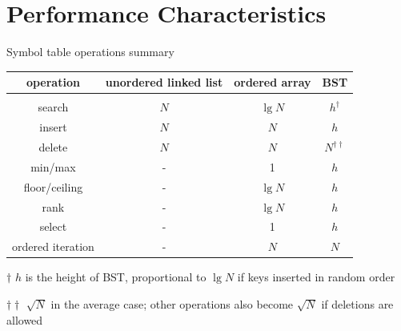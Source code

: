 \documentclass[8pt,a4paper,compress]{beamer}
\begin{document}
\section{Performance Characteristics}
\begin{frame}[fragile]
\pause

Symbol table operations summary
\begin{center}
\begin{tabular}{cccc}
operation & unordered linked list & ordered array & BST \\ \hline \\
search & $N$ & $\lg N$ & $h^\dagger$ \\
insert & $N$ & $N$ & $h$ \\
delete & $N$ & $N$ & $N^{\dagger\dagger}$ \\
min/max & - & 1 & $h$ \\
floor/ceiling & - & $\lg N$ & $h$\\
rank & - & $\lg N$ & $h$ \\
select & - & 1 & $h$ \\
ordered iteration & - & $N$ & $N$ 
\end{tabular} 

\bigskip

\tiny $\dagger$ $h$ is the height of BST, proportional to $\lg N$ if keys inserted in random order

$\dagger\dagger$ $\sqrt{N}$ in the average case; other operations also become $\sqrt{N}$ if deletions are allowed
\end{center}
\end{frame}
\end{document}
